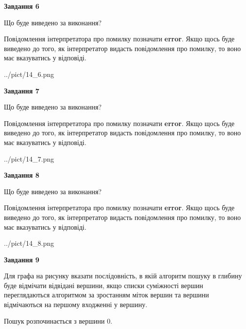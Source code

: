 \documentclass[12pt, ukrainian]{article}
\begin{document}
{\begin {large}
{\begin {center}\textbf{Завдання 6}\end {center}}\par
Що буде виведено за виконання?

Повідомлення інтерпретатора про помилку позначати \textbf{error}.
Якщо щось буде виведено до того, як інтерпретатор видасть повідомлення про помилку, 
то воно має вказуватись у відповіді. \par


\begin{center}
	{../pict/14_6.png}
\end{center}
\newpage

{\begin {center}\textbf{Завдання 7}\end {center}}\par
Що буде виведено за виконання?

Повідомлення інтерпретатора про помилку позначати \textbf{error}.
Якщо щось буде виведено до того, як інтерпретатор видасть повідомлення про помилку, 
то воно має вказуватись у відповіді. \par


\begin{center}
	{../pict/14_7.png}
\end{center}
\newpage

{\begin {center}\textbf{Завдання 8}\end {center}}\par
Що буде виведено за виконання?

Повідомлення інтерпретатора про помилку позначати \textbf{error}.
Якщо щось буде виведено до того, як інтерпретатор видасть повідомлення про помилку, 
то воно має вказуватись у відповіді. \par


\begin{center}
	{../pict/14_8.png}
\end{center}
\newpage

{\begin {center}\textbf{Завдання 9}\end {center}}\par
Для графа на рисунку вказати послідовність, в якій алгоритм пошуку в глибину буде відмічати відвідані вершини, якщо списки суміжності вершин переглядаються алгоритмом за зростанням міток вершин та вершини відмічаються на першому вход\-женні у вершину.\par
Пошук розпочинається з вершини 0.\par


\end{large}}
\end{document}
